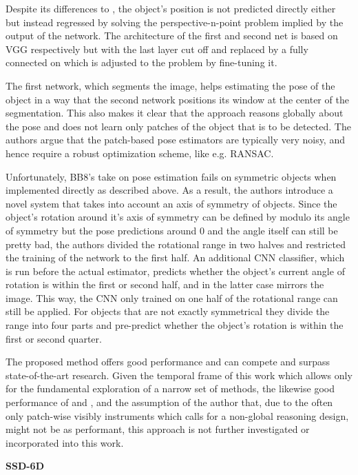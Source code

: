 Despite its differences to \cite{brachmann1}, the object's position is not predicted directly either but instead regressed by solving the perspective-n-point problem implied by the output of the network. The architecture of the first and second net is based on VGG respectively but with the last layer cut off and replaced by a fully connected on which is adjusted to the problem by fine-tuning it. 

The first network, which segments the image, helps estimating the pose of the object in a way that the second network positions its window at the center of the segmentation. This also makes it clear that the approach reasons globally about the pose and does not learn only patches of the object that is to be detected. The authors argue that the patch-based pose estimators are typically very noisy, and hence require a robust optimization scheme, like e.g. RANSAC. 

Unfortunately, BB8's take on pose estimation fails on symmetric objects when implemented directly as described above. As a result, the authors introduce a novel system that takes into account an axis of symmetry of objects. Since the object's rotation around it's axis of symmetry can be defined by modulo its angle of symmetry but the pose predictions around 0 and the angle itself can still be pretty bad, the authors divided the rotational range in two halves and restricted the training of the network to the first half. An additional CNN classifier, which is run before the actual estimator, predicts whether the object's current angle of rotation is within the first or second half, and in the latter case mirrors the image. This way, the CNN only trained on one half of the rotational range can still be applied. For objects that are not exactly symmetrical they divide the range into four parts and pre-predict whether the object's rotation is within the first or second quarter. 

The proposed method offers good performance and can compete and surpass state-of-the-art research. Given the temporal frame of this work which allows only for the fundamental exploration of a narrow set of methods, the likewise good performance of \cite{brachmann2} and \cite{pertsch}, and the assumption of the author that, due to the often only patch-wise visibly instruments which calls for a non-global reasoning design, \cite{bb8} might not be as performant, this approach is not further investigated or incorporated into this work.

\quad \textbf{SSD-6D}

